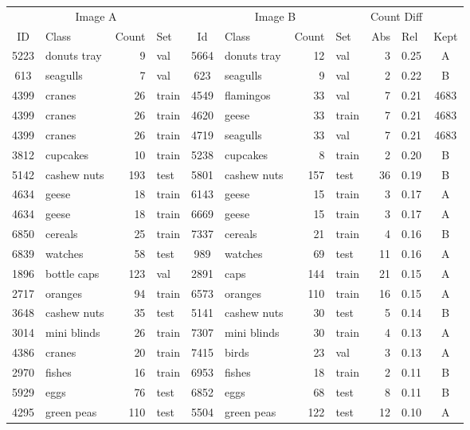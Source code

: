 \begin{tabular}{clrlclrlrlc}
 \toprule
\multicolumn{4}{c}{Image A} & \multicolumn{4}{c}{Image B} & \multicolumn{2}{c}{Count Diff} \\
ID & Class & Count & Set & Id & Class & Count & Set & Abs & Rel & Kept\\
\cmidrule(r){1-4} \cmidrule(r){5-8} \cmidrule(r){9-10} \cmidrule(r){11-11} 
5223 & donuts tray & 9 & val & 5664 & donuts tray & 12 & val & 3 & 0.25 & A\\
613 & seagulls & 7 & val & 623 & seagulls & 9 & val & 2 & 0.22 & B\\
4399 & cranes & 26 & train & 4549 & flamingos & 33 & val & 7 & 0.21 & 4683\\
4399 & cranes & 26 & train & 4620 & geese & 33 & train & 7 & 0.21 & 4683\\
4399 & cranes & 26 & train & 4719 & seagulls & 33 & val & 7 & 0.21 & 4683\\
3812 & cupcakes & 10 & train & 5238 & cupcakes & 8 & train & 2 & 0.20 & B \\
5142 & cashew nuts & 193 & test & 5801 & cashew nuts & 157 & test & 36 & 0.19 & B\\
4634 & geese & 18 & train & 6143 & geese & 15 & train & 3 & 0.17 & A\\
4634 & geese & 18 & train & 6669 & geese & 15 & train & 3 & 0.17 & A \\
6850 & cereals & 25 & train & 7337 & cereals & 21 & train & 4 & 0.16 & B\\
6839 & watches & 58 & test & 989 & watches & 69 & test & 11 & 0.16 & A\\
1896 & bottle caps & 123 & val & 2891 & caps & 144 & train & 21 & 0.15 & A\\
2717 & oranges & 94 & train & 6573 & oranges & 110 & train & 16 & 0.15 & A\\
3648 & cashew nuts & 35 & test & 5141 & cashew nuts & 30 & test & 5 & 0.14 & B\\
3014 & mini blinds & 26 & train & 7307 & mini blinds & 30 & train & 4 & 0.13 & A \\
4386 & cranes & 20 & train & 7415 & birds & 23 & val & 3 & 0.13 & A\\
2970 & fishes & 16 & train & 6953 & fishes & 18 & train & 2 & 0.11 & B\\
5929 & eggs & 76 & test & 6852 & eggs & 68 & test & 8 & 0.11 & B\\
4295 & green peas & 110 & test & 5504 & green peas & 122 & test & 12 & 0.10 & A\\

\end{tabular}
